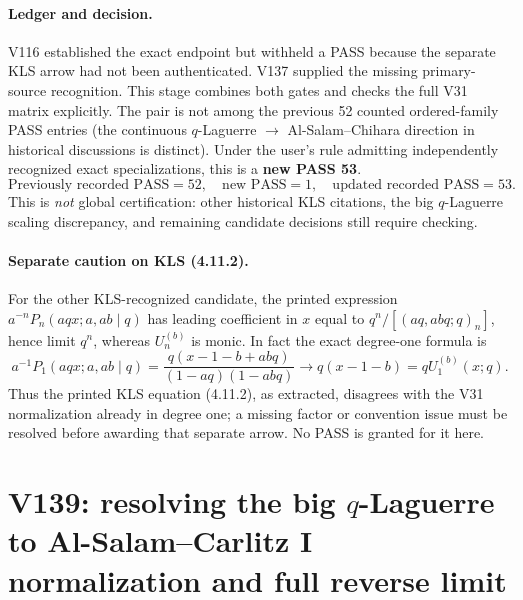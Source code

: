 \documentclass[11pt]{article}
\begin{document}
\paragraph{Ledger and decision.}
V116 established the exact endpoint but withheld a PASS because the separate KLS arrow had not been authenticated. V137 supplied the missing primary-source recognition. This stage combines both gates and checks the full V31 matrix explicitly. The pair is not among the previous 52 counted ordered-family PASS entries (the continuous $q$-Laguerre $\to$ Al-Salam--Chihara direction in historical discussions is distinct). Under the user's rule admitting independently recognized exact specializations, this is a \textbf{new PASS 53}.
\[
 \boxed{\text{Previously recorded PASS}=52,\quad\text{new PASS}=1,\quad\text{updated recorded PASS}=53.}
\]
This is \emph{not} global certification: other historical KLS citations, the big $q$-Laguerre scaling discrepancy, and remaining candidate decisions still require checking.

\paragraph{Separate caution on KLS (4.11.2).}
For the other KLS-recognized candidate, the printed expression $a^{-n}P_n(aqx;a,ab\mid q)$ has leading coefficient in $x$ equal to
$q^n/[(aq,abq;q)_n]$, hence limit $q^n$, whereas $U_n^{(b)}$ is monic. In fact the exact degree-one formula is
\[
 a^{-1}P_1(aqx;a,ab\mid q)=
 \frac{q(x-1-b+abq)}{(1-aq)(1-abq)}\longrightarrow q(x-1-b)=qU_1^{(b)}(x;q).
\]
Thus the printed KLS equation (4.11.2), as extracted, disagrees with the V31 normalization already in degree one; a missing factor or convention issue must be resolved before awarding that separate arrow. No PASS is granted for it here.


\clearpage
\section{V139: resolving the big $q$-Laguerre to Al-Salam--Carlitz I normalization and full reverse limit}
\label{sec:v139-biglag-asci}
\end{document}
